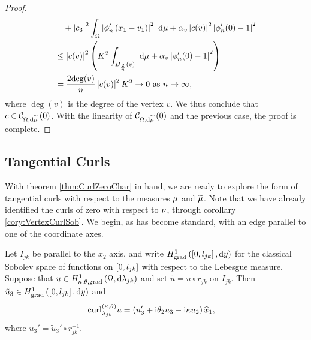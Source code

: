\begin{proof}
\begin{align*}
		&\quad + \left\lvert c_3 \right\rvert^2\int_{\Omega} \left\lvert \phi'_n\left( x_1-v_1 \right) \right\rvert^2  \ \mathrm{d}\mu
		+ \alpha_v\left\lvert c(v) \right\rvert^2\left\lvert \phi'_n(0)-1 \right\rvert^2 \\
		&\leq \left\lvert c(v) \right\rvert^2 \left(  K^2\int_{B_{\frac{2}{n}}(v)}  \ \mathrm{d}\mu
		+ \alpha_v\left\lvert \phi'_n(0)-1 \right\rvert^2  \right) \\
		&= \frac{2\mathrm{deg}(v)}{n}\left\lvert c(v) \right\rvert^2 K^2 \rightarrow 0 \ \text{as} \ n \rightarrow\infty,
	\end{align*}
	where $\mathrm{\deg}(v)$ is the degree of the vertex $v$.
	We thus conclude that $c\in\mathcal{C}_{ \Omega, \mathrm{d}\widetilde{\mu}}\left( 0 \right)$.
	With the linearity of $\mathcal{C}_{ \Omega, \mathrm{d}\widetilde{\mu}}\left( 0 \right)$ and the previous case, the proof is complete.
\end{proof}

\subsection{Tangential Curls} \label{ssec:TangCurls}
With theorem \ref{thm:CurlZeroChar} in hand, we are ready to explore the form of tangential curls with respect to the measures $\mu$ and $\widetilde{\mu}$.
Note that we have already identified the curls of zero with respect to $\nu$, through corollary \ref{cory:VertexCurlSob}.
We begin, as has become standard, with an edge parallel to one of the coordinate axes.
\begin{prop} \label{prop:TangCurlEdgeParallel}
	Let $I_{jk}$ be parallel to the $x_2$ axis, and write $H^1_\mathrm{grad}\left( \left[ 0,l_{jk} \right], \mathrm{d}y \right)$ for the classical Sobolev space of functions on $\left[ 0,l_{jk} \right]$ with respect to the Lebesgue measure.
	Suppose that $u\in H^1_{\kappa,\theta,\mathrm{grad}}\left( \Omega, \mathrm{d}\lambda_{jk} \right)$ and set $\tilde{u}=u\circ r_{jk}$ on $I_{jk}$.
	Then $\tilde{u}_3\in H^1_\mathrm{grad}\left( \left[ 0,l_{jk} \right], \mathrm{d}y \right)$ and 
	\begin{align*}
		\mathrm{curl}_{\lambda_{jk}}^{\left( \kappa, \theta \right)}u &= \left(  u_3' + \mathrm{i}\theta_2 u_3 - \mathrm{i}\kappa u_2  \right)\widehat{x}_1,
	\end{align*}
	where $u_3'=\tilde{u}_3'\circ r_{jk}^{-1}$.
\end{prop}

